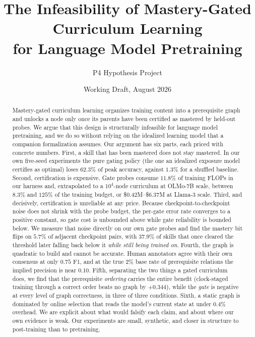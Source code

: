 \documentclass[11pt]{article}
\title{The Infeasibility of Mastery-Gated Curriculum Learning\\
for Language Model Pretraining}
\author{P4 Hypothesis Project}
\date{Working Draft, August 2026}
\theoremstyle{plain}
\theoremstyle{definition}
\theoremstyle{remark}
\begin{document}
\maketitle

\begin{abstract}
Mastery-gated curriculum learning organizes training content into a prerequisite
graph and unlocks a node only once its parents have been certified as mastered by
held-out probes. We argue that this design is structurally infeasible for
language model pretraining, and we do so without relying on the idealized
learning model that a companion formalization assumes. Our argument
has six parts, each priced with concrete numbers. First, a skill that has been
mastered does not stay mastered. In our own five-seed experiments the pure gating
policy (the one an idealized exposure model certifies as optimal) loses
$62.3\%$ of peak accuracy, against $1.3\%$ for a shuffled baseline. Second,
certification is expensive. Gate probes consume $11.8\%$ of training FLOPs in our
harness and, extrapolated to a $10^4$-node curriculum at OLMo-7B scale, between
$8.3\%$ and $125\%$ of the training budget, or \$0.42M--\$6.37M at Llama-3 scale.
Third, and decisively, certification is unreliable at any price. Because
checkpoint-to-checkpoint noise does not shrink with the probe budget, the
per-gate error rate converges to a positive constant, so gate cost is unbounded
above while gate reliability is bounded below. We measure that noise directly on
our own gate probes and find the mastery bit flips on $5.7\%$ of adjacent
checkpoint pairs, with $37.9\%$ of skills that once cleared the threshold later
falling back below it \emph{while still being trained on}. Fourth, the graph is
quadratic to build and cannot be accurate. Human annotators agree with their own
consensus at only $0.75$ F1, and at the true $2\%$ base rate of prerequisite
relations the implied precision is near $0.10$. Fifth, separating the two things
a gated curriculum does, we find that the prerequisite \emph{ordering} carries
the entire benefit (clock-staged training through a correct order beats no
graph by $+0.344$), while the \emph{gate} is negative at every level of graph
correctness, in three of three conditions. Sixth, a static graph is dominated by
online selection that reads the model's current state at under $0.4\%$ overhead.
We are explicit about what would falsify each claim, and about where our own
evidence is weak. Our experiments are small, synthetic, and closer in structure
to post-training than to pretraining.
\end{abstract}
\end{document}
